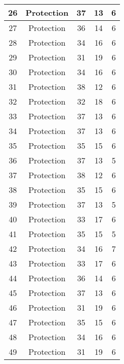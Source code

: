 \documentclass[results.tex]{subfiles}
\begin{document}
\begin{center}
\begin{tabular}{| c || c | c | c | c |}
    \hline
    26 & Protection & 37 & 13 & 6 \\ 
    \hline
    27 & Protection & 36 & 14 & 6 \\ 
    \hline
    28 & Protection & 34 & 16 & 6 \\ 
    \hline
    29 & Protection & 31 & 19 & 6 \\ 
    \hline
    30 & Protection & 34 & 16 & 6 \\ 
    \hline
    31 & Protection & 38 & 12 & 6 \\ 
    \hline
    32 & Protection & 32 & 18 & 6 \\ 
    \hline
    33 & Protection & 37 & 13 & 6 \\ 
    \hline
    34 & Protection & 37 & 13 & 6 \\ 
    \hline
    35 & Protection & 35 & 15 & 6 \\ 
    \hline
    36 & Protection & 37 & 13 & 5 \\ 
    \hline
    37 & Protection & 38 & 12 & 6 \\ 
    \hline
    38 & Protection & 35 & 15 & 6 \\ 
    \hline
    39 & Protection & 37 & 13 & 5 \\ 
    \hline
    40 & Protection & 33 & 17 & 6 \\ 
    \hline
    41 & Protection & 35 & 15 & 5 \\ 
    \hline
    42 & Protection & 34 & 16 & 7 \\ 
    \hline
    43 & Protection & 33 & 17 & 6 \\ 
    \hline
    44 & Protection & 36 & 14 & 6 \\ 
    \hline
    45 & Protection & 37 & 13 & 6 \\ 
    \hline
    46 & Protection & 31 & 19 & 6 \\ 
    \hline
    47 & Protection & 35 & 15 & 6 \\ 
    \hline
    48 & Protection & 34 & 16 & 6 \\ 
    \hline
    49 & Protection & 31 & 19 & 6 \\ 
    \hline   \end{tabular}
\end{center}
\end{document}
